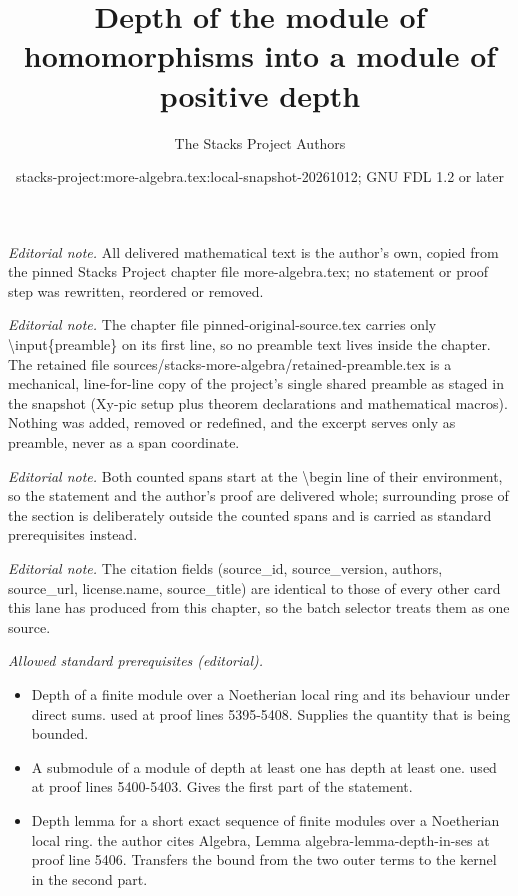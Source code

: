 \documentclass[10pt,a4paper]{amsart}
\title{Depth of the module of homomorphisms into a module of positive depth}
\author{The Stacks Project Authors}
\date{stacks-project:more-algebra.tex:local-snapshot-20261012; GNU FDL 1.2 or later}
\theoremstyle{plain}
\theoremstyle{definition}
\theoremstyle{remark}
\numberwithin{equation}{subsection}
\begin{document}
\maketitle
\setcounter{subsection}{1}
\noindent\textit{Editorial note.} All delivered mathematical text is the author's own, copied from the pinned Stacks Project chapter file more-algebra.tex; no statement or proof step was rewritten, reordered or removed.\par\medskip
\noindent\textit{Editorial note.} The chapter file pinned-original-source.tex carries only \textbackslash{}input\{preamble\} on its first line, so no preamble text lives inside the chapter. The retained file sources/stacks-more-algebra/retained-preamble.tex is a mechanical, line-for-line copy of the project's single shared preamble as staged in the snapshot (Xy-pic setup plus theorem declarations and mathematical macros). Nothing was added, removed or redefined, and the excerpt serves only as preamble, never as a span coordinate.\par\medskip
\noindent\textit{Editorial note.} Both counted spans start at the \textbackslash{}begin line of their environment, so the statement and the author's proof are delivered whole; surrounding prose of the section is deliberately outside the counted spans and is carried as standard prerequisites instead.\par\medskip
\noindent\textit{Editorial note.} The citation fields (source\_id, source\_version, authors, source\_url, license.name, source\_title) are identical to those of every other card this lane has produced from this chapter, so the batch selector treats them as one source.\par\medskip
\noindent\textit{Allowed standard prerequisites (editorial).}\begin{itemize}
\item Depth of a finite module over a Noetherian local ring and its behaviour under direct sums. used at proof lines 5395-5408. Supplies the quantity that is being bounded.
\item A submodule of a module of depth at least one has depth at least one. used at proof lines 5400-5403. Gives the first part of the statement.
\item Depth lemma for a short exact sequence of finite modules over a Noetherian local ring. the author cites Algebra, Lemma algebra-lemma-depth-in-ses at proof line 5406. Transfers the bound from the two outer terms to the kernel in the second part.
\end{itemize}\medskip
\end{document}
